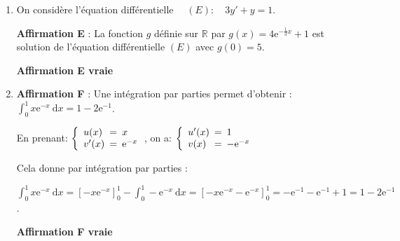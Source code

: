 \documentclass[10pt]{article}
\providecommand{\blue}{\color{blue}}
\providecommand{\R}{\mathbb{R}}
\providecommand{\e}{{\mathrm{e}}}
\providecommand{\blue}{\color{blue}}
\begin{document}
\begin{enumerate}
\begin{flushright}
\textbf{\blue Affirmation D fausse}
\end{flushright}

\item On considère l'équation différentielle
$\quad  (E): \quad 3y' + y = 1$.

\textbf{Affirmation E} : La fonction $g$ définie sur $\R$ par 
$g(x) = 4\e^{- \frac13 x} + 1$
est solution de l'équation différentielle $(E)$ avec $g(0) = 5$.


\begin{flushright}
\textbf{\blue Affirmation E vraie}
\end{flushright}

\item \textbf{Affirmation F} : Une intégration par parties permet d'obtenir : 
$\displaystyle\int_0^1 x\e^{-x}\:\text{d}x = 1 - 2\e^{-1}$.

En prenant:
$\left\{
\begin{array}{l !{=} l}
u(x) & x \\
v'(x)  &  \e^{-x}
\end{array}\right.$, on a:
$\left\{
\begin{array}{l !{=} l}
u'(x) & 1\\
v(x) & - \e^{-x}
\end{array}\right.$

Cela donne par intégration par parties :

$\displaystyle\int_0^1 x\e^{-x}\:\text{d}x  = \left[- x \e^{-x}\right]_0^1  - \displaystyle\int_0^1 - \e^{-x}\:\text{d}x = \left[- x \e^{-x} - \e^{-x}\right]_0^1 = - \e^{-1} - \e^{-1}  + 1 = 1 - 2\e^{- 1}$. 

\begin{flushright}
\textbf{\blue Affirmation F vraie}
\end{flushright}

\end{enumerate}

\bigskip
\end{document}
